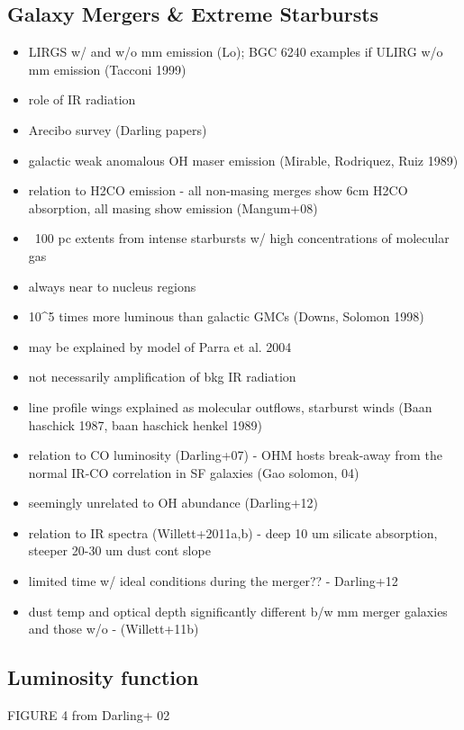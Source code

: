 \subsection{Galaxy Mergers \& Extreme Starbursts}

\begin{itemize}
\item LIRGS w/ and w/o mm emission (Lo); BGC 6240 examples if ULIRG w/o mm emission (Tacconi 1999)
\item role of IR radiation
\item Arecibo survey (Darling papers)
\item galactic weak anomalous OH maser emission (Mirable, Rodriquez, Ruiz 1989)
\item relation to H2CO emission - all non-masing merges show 6cm H2CO absorption, all masing show emission (Mangum+08)
\item ~100 pc extents from intense starbursts w/ high concentrations of molecular gas
\item always near to nucleus regions
\item 10^5 times more luminous than galactic GMCs (Downs, Solomon 1998)
\item may be explained by model of Parra et al. 2004
\item not necessarily amplification of bkg IR radiation
\item line profile wings explained as molecular outflows, starburst winds (Baan haschick 1987, baan haschick henkel 1989)
\item relation to CO luminosity (Darling+07) - OHM hosts break-away from the normal IR-CO correlation in SF galaxies (Gao solomon, 04)
\item seemingly unrelated to OH abundance  (Darling+12)
\item relation to IR spectra (Willett+2011a,b) - deep 10 um silicate absorption, steeper 20-30 um dust cont slope
\item limited time w/ ideal conditions during the merger?? - Darling+12
\item dust temp and optical depth significantly different b/w mm merger galaxies and those w/o - (Willett+11b)
\end{itemize}

\subsection{Luminosity function}

FIGURE 4 from Darling+ 02

